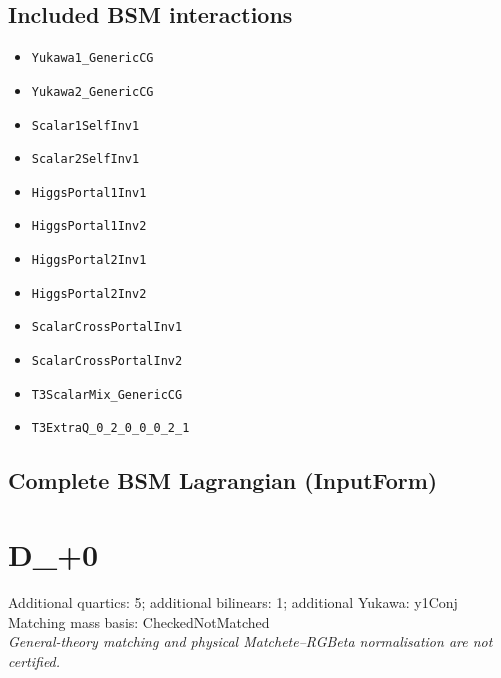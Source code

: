 \documentclass[10pt,a4paper]{article}
\begin{document}
\subsection*{Included BSM interactions}
\begin{itemize}
\item \texttt{Yukawa1\_GenericCG}
\item \texttt{Yukawa2\_GenericCG}
\item \texttt{Scalar1SelfInv1}
\item \texttt{Scalar2SelfInv1}
\item \texttt{HiggsPortal1Inv1}
\item \texttt{HiggsPortal1Inv2}
\item \texttt{HiggsPortal2Inv1}
\item \texttt{HiggsPortal2Inv2}
\item \texttt{ScalarCrossPortalInv1}
\item \texttt{ScalarCrossPortalInv2}
\item \texttt{T3ScalarMix\_GenericCG}
\item \texttt{T3ExtraQ\_0\_2\_0\_0\_0\_2\_1}
\end{itemize}
\subsection*{Complete BSM Lagrangian (InputForm)}

\clearpage
\section{D\_+0}
Additional quartics: 5; additional bilinears: 1; additional Yukawa: y1Conj\\
Matching mass basis: CheckedNotMatched\\
\emph{General-theory matching and physical Matchete--RGBeta normalisation are not certified.}
\end{document}
